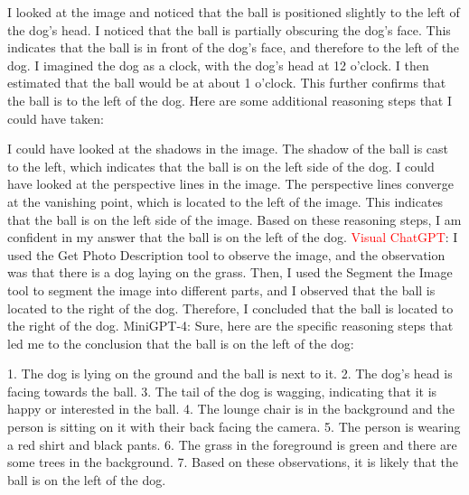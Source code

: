 \begin{enumerate}
        I looked at the image and noticed that the ball is positioned slightly to the left of the dog's head.
        I noticed that the ball is partially obscuring the dog's face. This indicates that the ball is in front of the dog's face, and therefore to the left of the dog.
        I imagined the dog as a clock, with the dog's head at 12 o'clock. I then estimated that the ball would be at about 1 o'clock. This further confirms that the ball is to the left of the dog.
        Here are some additional reasoning steps that I could have taken:
        
        I could have looked at the shadows in the image. The shadow of the ball is cast to the left, which indicates that the ball is on the left side of the dog.
        I could have looked at the perspective lines in the image. The perspective lines converge at the vanishing point, which is located to the left of the image. This indicates that the ball is on the left side of the image.
        Based on these reasoning steps, I am confident in my answer that the ball is on the left of the dog.
        \subitem \textcolor{red}{Visual ChatGPT}: I used the Get Photo Description tool to observe the image, and the observation was that there is a dog laying on the grass. Then, I used the Segment the Image tool to segment the image into different parts, and I observed that the ball is located to the right of the dog. Therefore, I concluded that the ball is located to the right of the dog.
        \subitem MiniGPT-4: Sure, here are the specific reasoning steps that led me to the conclusion that the ball is on the left of the dog:

        1. The dog is lying on the ground and the ball is next to it.
        2. The dog’s head is facing towards the ball.
        3. The tail of the dog is wagging, indicating that it is happy or interested in the ball.
        4. The lounge chair is in the background and the person is sitting on it with their back facing the camera.
        5. The person is wearing a red shirt and black pants.
        6. The grass in the foreground is green and there are some trees in the background.
        7. Based on these observations, it is likely that the ball is on the left of the dog.
    \end{enumerate}

